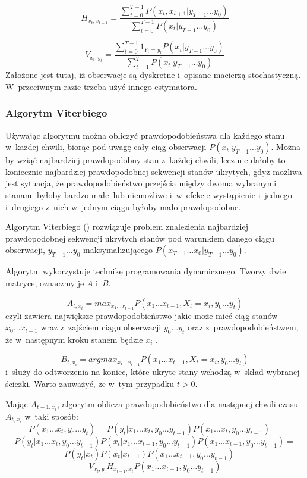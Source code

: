 $$H_{x_t, x_{t+1}} = \frac{\sum_{t=0}^{T-1} P(x_t, x_{t+1} | y_{T-1} \dots y_0)}{\sum_{t=0}^{T-1} P(x_t | y_{T-1} \dots y_0)}$$

$$V_{x_t, y_t} = \frac{\sum_{t=0}^{T-1} 1_{Y_t = y_t} P(x_t | y_{T-1} \dots y_0)}{\sum_{t=1}^T P(x_t | y_{T-1} \dots y_0)}$$
Założone jest tutaj, iż obserwacje są  dyskretne i~opisane macierzą stochastyczną. W~przeciwnym razie trzeba użyć innego estymatora.
\subsubsection{Algorytm Viterbiego}

Używając algorytmu  można obliczyć prawdopodobieństwa dla każdego stanu w~każdej chwili, biorąc
pod uwagę cały ciąg obserwacji $P(x_t | y_{T-1} \dots y_0)$. Można by wziąć najbardziej prawdopodobny stan z~każdej chwili,
lecz nie dałoby to koniecznie najbardziej prawdopodobnej sekwencji stanów ukrytych, gdyż możliwa jest sytuacja, że
prawdopodobieństwo przejścia między dwoma wybranymi stanami byłoby bardzo małe lub niemożliwe i~w~efekcie wystąpienie
i~jednego i~drugiego z~nich w~jednym ciągu byłoby mało prawdopodobne.

Algorytm Viterbiego () rozwiązuje problem znalezienia najbardziej prawdopodobnej sekwencji ukrytych stanów pod warunkiem danego ciągu obserwacji, $y_{T-1} \dots y_0$ maksymalizującego $P(x_{T-1} \dots x_0 | y_{T-1} \dots y_0)$.

Algorytm wykorzystuje technikę programowania dynamicznego. Tworzy dwie matryce, oznaczmy je $A$ i~$B$.

$$A_{t,x_i} = max_{x_1 \dots x_{t-1}} P(x_1 \dots x_{t-1}, X_t = x_i, y_0 \dots y_t)$$
czyli zawiera największe prawdopodobieństwo jakie może mieć ciąg stanów $x_0 \dots x_{t-1}$ wraz z~zajściem ciągu obserwacji $y_0 \dots y_t$ oraz z~prawdopodobieństwem, że w~następnym kroku stanem będzie $x_i$ .

$$B_{t,x_i} = argmax_{x_1 \dots x_{t-1}} P(x_1 \dots x_{t-1}, X_t = x_i, y_0 \dots y_t)$$ i~służy do odtworzenia na koniec, które ukryte stany wchodzą w~skład wybranej ścieżki. Warto zauważyć, że w~tym przypadku $t > 0$.

Mając $A_{t-1,x_i}$, algorytm oblicza prawdopodobieństwo dla następnej chwili czasu $A_{t,x_i}$ w~taki sposób:
$$P(x_1 \dots x_t, y_0 \dots y_t) = P(y_t | x_1 \dots x_t, y_0 \dots y_{t-1}) P(x_1 \dots x_t, y_0 \dots y_{t-1}) =$$
$$P(y_t | x_1 \dots x_t, y_0 \dots y_{t-1}) P(x_t | x_1 \dots x_{t-1}, y_0 \dots y_{t-1}) P(x_1 \dots x_{t-1}, y_0 \dots y_{t-1}) =$$
$$P(y_t | x_t) P(x_t | x_{t-1}) P(x_1 \dots x_{t-1}, y_0 \dots y_{t-1}) =$$
$$V_{x_t, y_t} H_{x_{t-1}, x_t} P(x_1 \dots x_{t-1}, y_0 \dots y_{t-1})$$

